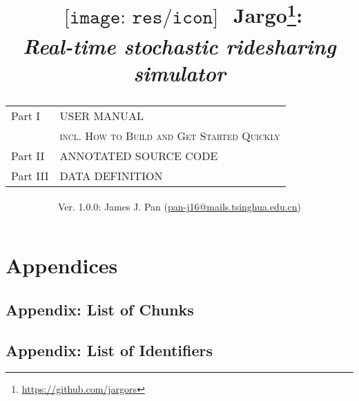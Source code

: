 \documentclass{report}
\title{
  $
  \begin{array}{l}
  \texttt{[image: res/icon]}
  \end{array}
  $
  Jargo\footnote{\url{https://github.com/jargors}}:\\
  \large{\textbf{\textit{Real-time stochastic ridesharing simulator}}}\\
  \vspace{2em}
  {
    \small
    \begin{tabular}{lp{.6\textwidth}}
    \toprule
    Part I  &\textsc{USER MANUAL }\\
            &\textsc{incl. How to Build and Get Started Quickly}\\
    Part II &\textsc{ANNOTATED SOURCE CODE}\\
    Part III&\textsc{DATA DEFINITION}\\
    \bottomrule
    \end{tabular}
  }
}
\author{
  \small{Ver. 1.0.0: James J. Pan (\href{mailto:pan-j16@mails.tsinghua.edu.cn}{pan-j16@mails.tsinghua.edu.cn})}
}
\theoremstyle{definition}                   %
\begin{document}
\maketitle
\pagestyle{noweb}

\renewcommand{\thepage}{\roman{page}}
\setcounter{page}{1}

\tableofcontents



\part{Appendices}
\appendix

\chapter{Appendix: List of Chunks}
\nowebchunks

\chapter{Appendix: List of Identifiers}
\nowebindex
\end{document}

